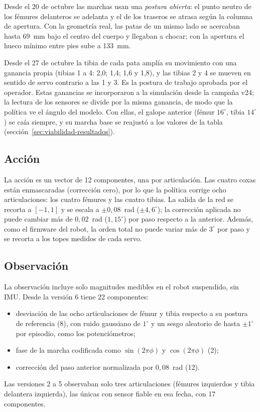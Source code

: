 Desde el 20 de octubre las marchas usan una \emph{postura abierta}: el punto
neutro de los fémures delanteros se adelanta y el de los traseros se atrasa según la
columna de apertura. Con la geometría real, las patas de
un mismo lado se acercaban hasta 69~mm bajo el centro del cuerpo y llegaban a
chocar; con la apertura el hueco mínimo entre pies sube a 133~mm.

Desde el 27 de octubre la tibia de cada pata amplía su movimiento con una ganancia
propia (tibias 1 a 4: 2,0; 1,4; 1,6 y 1,8), y las tibias 2 y 4 se mueven en sentido
de servo contrario a las 1 y 3. Es la postura de trabajo aprobada por el operador. Estas
ganancias se incorporaron a la simulación desde la campaña v24; la lectura de los
sensores se divide por la misma ganancia, de modo que la política ve el ángulo del
modelo. Con ellas, el galope anterior (fémur $16^\circ$, tibia $14^\circ$) se caía
siempre, y su marcha base se reajustó a los valores de la tabla
(sección~\ref{sec:viabilidad-resultados}).

\subsection{Acción}

La acción es un vector de 12 componentes, una por articulación. Las cuatro
coxas están enmascaradas (corrección cero), por lo que la política corrige
ocho articulaciones: los cuatro fémures y las cuatro tibias. La salida de la
red se recorta a $[-1,1]$ y se escala a $\pm0{,}08$~rad ($\pm4{,}6^\circ$); la
corrección aplicada no puede cambiar más de $0{,}02$~rad ($1{,}15^\circ$) por
paso respecto a la anterior. Además, como el firmware del robot, la orden total
no puede variar más de $3^\circ$ por paso y se recorta a los topes medidos de
cada servo.

\subsection{Observación}

La observación incluye solo magnitudes medibles en el robot suspendido, sin IMU. Desde la versión 6 tiene 22 componentes:
\begin{itemize}
    \item desviación de las ocho articulaciones de fémur y tibia respecto a su
    postura de referencia (8), con ruido gaussiano de $1^\circ$ y un sesgo
    aleatorio de hasta $\pm1^\circ$ por episodio, como los potenciómetros;
    \item fase de la marcha codificada como $\sin(2\pi\phi)$ y $\cos(2\pi\phi)$ (2);
    \item corrección del paso anterior normalizada por $0{,}08$~rad (12).
\end{itemize}
Las versiones 2 a 5 observaban solo tres articulaciones (fémures izquierdos y
tibia delantera izquierda), las únicas con sensor fiable en esa fecha, con 17
componentes.

